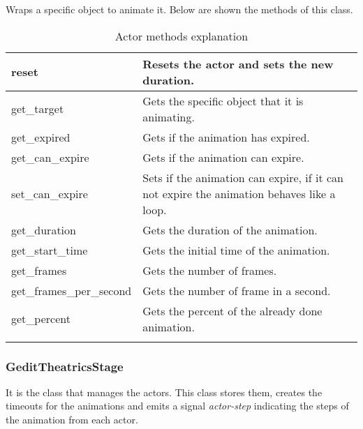 Wraps a specific object to animate it. Below are shown the methods of this class.

\begin{table}[H]
  \begin{center}
    \begin{tabularx}{\textwidth}{|X|X|}
      \firsthline
      reset & Resets the actor and sets the new duration. \\
      \hline
      get\_target & Gets the specific object that it is animating. \\
      \hline
      get\_expired & Gets if the animation has expired. \\
      \hline
      get\_can\_expire & Gets if the animation can expire. \\
      \hline
      set\_can\_expire & Sets if the animation can expire, if it can not expire the animation behaves like a loop. \\
      \hline
      get\_duration & Gets the duration of the animation. \\
      \hline
      get\_start\_time & Gets the initial time of the animation. \\
      \hline
      get\_frames & Gets the number of frames. \\
      \hline
      get\_frames\_per\_second & Gets the number of frame in a second. \\
      \hline
      get\_percent & Gets the percent of the already done animation. \\
      \lasthline
    \end{tabularx}
    \caption{Actor methods explanation}
  \end{center}
\end{table}

\newpage
\subsubsection{GeditTheatricsStage}

It is the class that manages the actors. This class stores them, creates the timeouts for the animations and emits a signal \emph{actor-step} indicating the steps of the animation from each actor.

